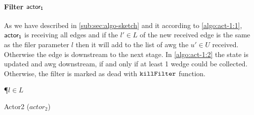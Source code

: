 \paragraph{Filter $\mathsf{actor_1}$} As we have described in \autoref{sub:sec:algo-sketch} and it according to \autoref{algo:act-1:1}, $\mathsf{actor_1}$ is receiving all edges 
and if the $l' \in L$ of the new received edge is the same as the filer parameter $l$ then it will add to the list of \acrshort{awg} the $u' \in U$ received. Otherwise the edge is downstream to the next stage.
In \autoref{algo:act-1:2} the state is updated and \acrshort{awg} downstream, if and only if at least 1 wedge could be collected. Otherwise, the filter is marked as dead with $\mathtt{killFilter}$ function.

\begin{algorithm}
\SetAlgoRefName{[A6]}
\P{$l \in L$}
\BlankLine
{}
\PC{$|\dwi| \geq 1 \lor \fid$}
\caption{Actor2 ($actor_2$)}
\label{algo:act-2}
\end{algorithm}

